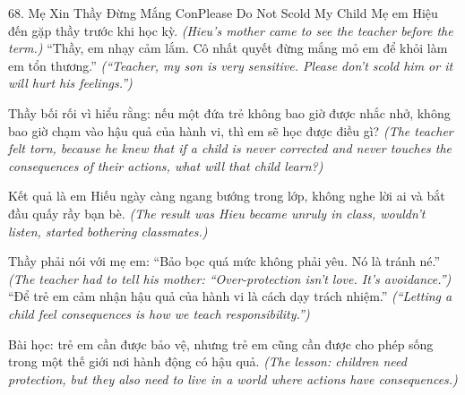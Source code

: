 \begin{truyen}{68. Mẹ Xin Thầy Đừng Mắng Con}{Please Do Not Scold My Child}
Mẹ em Hiệu đến gặp thầy trước khi học kỳ.
\textit{(Hieu's mother came to see the teacher before the term.)}
``Thầy, em nhạy cảm lắm. Cô nhất quyết đừng mắng mỏ em để khỏi làm em tổn thương.''
\textit{(``Teacher, my son is very sensitive. Please don't scold him or it will hurt his feelings.'')}

Thầy bối rối vì hiểu rằng: nếu một đứa trẻ không bao giờ được nhắc nhở, không bao giờ chạm vào hậu quả của hành vi, thì em sẽ học được điều gì?
\textit{(The teacher felt torn, because he knew that if a child is never corrected and never touches the consequences of their actions, what will that child learn?)}

Kết quả là em Hiếu ngày càng ngang bướng trong lớp, không nghe lời ai và bắt đầu quấy rầy bạn bè.
\textit{(The result was Hieu became unruly in class, wouldn't listen, started bothering classmates.)}

Thầy phải nói với mẹ em: ``Bảo bọc quá mức không phải yêu. Nó là tránh né.''
\textit{(The teacher had to tell his mother: ``Over-protection isn't love. It's avoidance.'')}
``Để trẻ em cảm nhận hậu quả của hành vi là cách dạy trách nhiệm.''
\textit{(``Letting a child feel consequences is how we teach responsibility.'')}

Bài học: trẻ em cần được bảo vệ, nhưng trẻ em cũng cần được cho phép sống trong một thế giới nơi hành động có hậu quả.
\textit{(The lesson: children need protection, but they also need to live in a world where actions have consequences.)}
\end{truyen}

